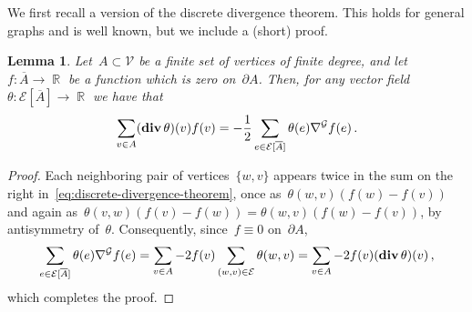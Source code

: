 \documentclass[12pt]{amsart}
\numberwithin{equation}{section}
\DeclareMathOperator{\R}{\mathbb{R}}
\newtheorem{lemma}[theorem]{Lemma}
\renewcommand{\div}{\mathop{\bf div}}
\newcommand{\V}{\mathcal{V}}
\newcommand{\E}{\mathcal{E}}
\begin{document}
We first recall a version of the discrete divergence theorem. This holds for general graphs
and is well known, but we include a (short) proof. 
\begin{lemma} \label{lemma:discrete-divergence-theorem}
		Let~$A \subset \V$ be a finite set of vertices of finite degree, and let~$f: \overline{A} \to \R$ be a function which is
	zero on~$\partial A$. Then, for any vector field~$\theta: \E[\overline{A}] \to \R$ we have that 
	\begin{equation}
		\label{eq:discrete-divergence-theorem}
	\sum_{v \in A} (\div \theta)(v) f(v) = - \frac{1}{2} \sum_{e \in \E[\overline{A}]} \theta(e) \nabla^{\mathcal{G}} f(e) \, . 
\end{equation}
\end{lemma}
\begin{proof}
	Each neighboring pair of vertices~$\{w,v\}$ appears twice in the sum on the right in~\eqref{eq:discrete-divergence-theorem}, once as~$\theta(w,v) (f(w) - f(v))$
	and again as~$\theta(v,w) (f(v)-f(w)) = \theta(w,v) (f(w)-f(v))$, by antisymmetry of~$\theta$. Consequently, since~$f \equiv 0$ on~$\partial A$, 
	\[
		\sum_{e \in \E[\overline{A}]} \theta(e) \nabla^{\mathcal{G}} f(e) =  \sum_{v \in A} -2 f(v) \sum_{(w,v) \in \E} \theta(w,v)  
		= \sum_{v \in A} -2 f(v) (\div \theta)(v) \, , 
	\]
	which completes the proof.
\end{proof}
\end{document}
